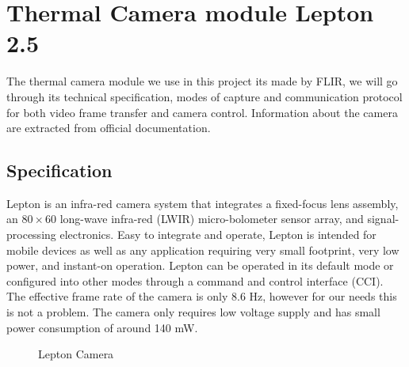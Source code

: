 \section{Thermal Camera module Lepton 2.5}
\label{sec:thermalcamera}
The thermal camera module we use in this project its made by FLIR, we will go
through its technical specification, modes of capture and communication protocol
for both video frame transfer and camera control. Information about the camera
are extracted from official documentation.
%
\subsection{Specification}
\label{ssec:specificationthermalcam}
Lepton is an infra-red camera system that integrates a fixed-focus lens assembly,
an $80 \times 60$ long-wave infra-red (LWIR) micro-bolometer sensor array, and
signal-processing electronics. Easy to integrate and operate, Lepton is intended
for mobile devices as well as any application requiring very small
footprint, very low power, and instant-on operation. Lepton can be operated in
its default mode or configured into other modes through a command and control
interface (CCI). The effective frame rate of the camera is only 8.6 \si{\hertz},
however for our needs this is not a problem. The camera only requires low
voltage supply and has small power consumption of around 140 \si{\milli\watt}.
\begin{figure}[!htb]
    \centering
     \quad
    \caption{Lepton Camera}
    \label{fig:camerarender}
\end{figure}
%
